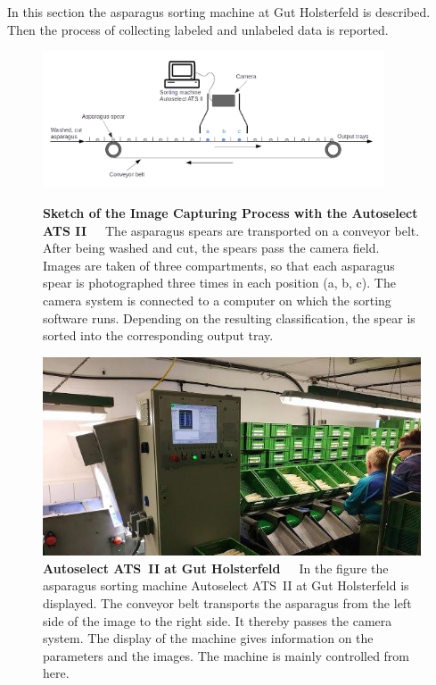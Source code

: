 In this section the asparagus sorting machine at Gut Holsterfeld is described. Then the process of collecting labeled and unlabeled data is reported.

\begin{figure}[!t]
	\centering
	\includegraphics[width=0.9\textwidth]{Figures/chapter02/asparagusconveyerbelt_new.png}
	\decoRule
	\caption[Sketch of the Image Capturing Process with the Autoselect ATS II]{\textbf{Sketch of the Image Capturing Process with the Autoselect ATS II}~~~The asparagus spears are transported on a conveyor belt. After being washed and cut, the spears pass the camera field. Images are taken of three compartments, so that each asparagus spear is photographed three times in each position (a, b, c). The camera system is connected to a computer on which the sorting software runs. Depending on the resulting classification, the spear is sorted into the corresponding output tray.}
	\label{fig:SortingMachineSketch}
	\vspace{15pt}
	\centering
	\includegraphics[scale=0.6]{Figures/chapter02/sortingmachine_front.png}
	\decoRule
	\caption[The Autoselect ATS II at Gut Holsterfeld]{\textbf{Autoselect ATS~II at Gut Holsterfeld}~~~In the figure the asparagus sorting machine Autoselect ATS~II at Gut Holsterfeld is displayed. The conveyor belt transports the asparagus from the left side of the image to the right side. It thereby passes the camera system. The display of the machine gives information on the parameters and the images. The machine is mainly controlled from here.}
	\label{fig:SortingMachine}
\end{figure}

